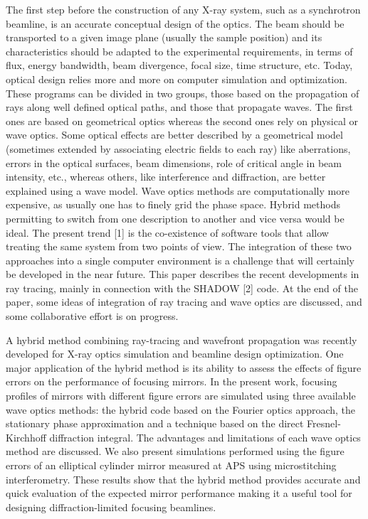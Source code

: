 \documentclass{aip-cp}
\begin{document}
The first step before the construction of any X-ray system, such as a synchrotron beamline, is an
accurate conceptual design of the optics. The beam should be transported to a given image plane
(usually the sample position) and its characteristics should be adapted to the experimental
requirements, in terms of flux, energy bandwidth, beam divergence, focal size, time structure, etc.
Today, optical design relies more and more on computer simulation and optimization. These programs
can be divided in two groups, those based on the propagation of rays along well defined optical paths,
and those that propagate waves. The first ones are based on geometrical optics whereas the second
ones rely on physical or wave optics. Some optical effects are better described by a geometrical model
(sometimes extended by associating electric fields to each ray) like aberrations, errors in the optical
surfaces, beam dimensions, role of critical angle in beam intensity, etc., whereas others, like
interference and diffraction, are better explained using a wave model. Wave optics methods are
computationally more expensive, as usually one has to finely grid the phase space. Hybrid methods
permitting to switch from one description to another and vice versa would be ideal. The present trend
[1] is the co-existence of software tools that allow treating the same system from two points of view.
The integration of these two approaches into a single computer environment is a challenge that will
certainly be developed in the near future. This paper describes the recent developments in ray tracing,
mainly in connection with the SHADOW [2] code. At the end of the paper, some ideas of integration
of ray tracing and wave optics are discussed, and some collaborative effort is on progress. 

A hybrid method combining ray-tracing and wavefront propagation was recently developed for X-ray optics simulation and beamline design optimization. One major application of the hybrid method is its ability to assess the effects of figure errors on the performance of focusing mirrors. In the present work, focusing profiles of mirrors with different figure errors are simulated using three available wave optics methods: the hybrid code based on the Fourier optics approach, the stationary phase approximation and a technique based on the direct Fresnel-Kirchhoff diffraction integral. The advantages and limitations of each wave optics method are discussed. We also present simulations performed using the figure errors of an elliptical cylinder mirror measured at APS using microstitching interferometry. These results show that the hybrid method provides accurate and quick evaluation of the expected mirror performance making it a useful tool for designing diffraction-limited focusing beamlines.
\end{document}
